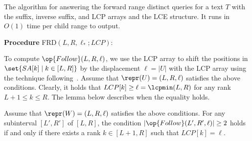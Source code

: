 


\begin{algorithm}[t]
  \caption{The algorithm for answering the forward range distinct queries for a text $T$ with  the suffix, inverse suffix, and LCP arrays and the LCE structure. It runs in $O(1)$ time per child range to output. 
  }\label{algo:frd}
  \textbf{Procedure} \textsc{FRD}$(L, R, \ell_*; LCP)$:\\  
\end{algorithm}

To compute $\op{Follow}(L, R, \ell)$, we use the LCP array to shift the positions in $\set{SA[k] \mid k \in [L, R]}$ by the displacement $\ell = |U|$  with the LCP array using the technique following~\cite{abouelhoda2004replacing,ohlebusch2013bookbioinfo}.
Assume that $\repr(U) = (L, R, \ell)$ satisfies the above conditions. Clearly, it holds that $LCP[k] \ge \ell = \lcpmin(L, R)$ for any rank $L+1 \le k\le R$. The lemma below describes when the equality holds. 

\begin{lemma}
\label{lem:child:interval:chara}
Assume that $\repr(W) = (L, R, \ell)$ satisfies the above conditions.
For any subinterval $[L', R']$ of $[L,R]$, 
the condition $|\op{Follow}(L', R', \ell)| \ge 2$ holds if and only if 
there exists a rank $k \in [L+1, R]$ such that $LCP[k] = \ell$. 
\end{lemma}

